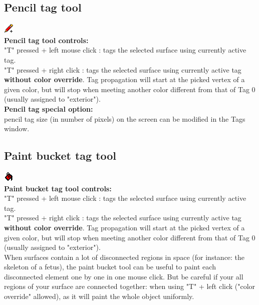 \subsection{Pencil tag tool}
\includegraphics[scale=0.7]{images/12/pencil.png}\\
\textbf{Pencil tag tool controls:}\\
"T" pressed + left mouse click : tags the selected surface using currently active tag.\\
"T" pressed + right click : tags the selected surface using currently active tag \textbf{without color override}. Tag propagation will start at the picked vertex of a given color, but will stop when meeting another color different from that of Tag 0 (usually assigned to "exterior").\\

\textbf{Pencil tag special option:}\\
\noindent
pencil tag size (in number of pixels) on the screen can be modified in the Tags window.



\subsection{Paint bucket tag tool}
\includegraphics[scale=0.7]{images/12/paint_bucket.png}\\
\textbf{Paint bucket tag tool controls:}\\
"T" pressed + left mouse click : tags the selected surface using currently active tag.\\
"T" pressed + right click : tags the selected surface using currently active tag \textbf{without color override}. Tag propagation will start at the picked vertex of a given color, but will stop when meeting another color different from that of Tag 0 (usually assigned to "exterior").\\
 
When surfaces contain a lot of disconnected regions in space (for instance: the skeleton of a fetus), the paint bucket tool can be useful to paint each disconnected element one by one in one mouse click. But be careful if your all regions of your surface are connected together: when using "T" + left click ("color override" allowed), as it will paint the whole object uniformly.

